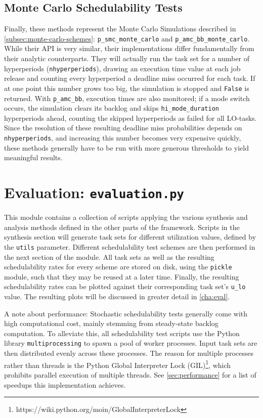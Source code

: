 \documentclass[a4paper,oneside]{csthesis}
\begin{document}
\subsection{Monte Carlo Schedulability Tests}
Finally, these methods represent the Monte Carlo Simulations described in \cref{subsec:monte-carlo-schemes}: \texttt{p\_smc\_monte\_carlo} and \texttt{p\_amc\_bb\_monte\_carlo}. While their API is very similar, their implementations differ fundamentally from their analytic counterparts. They will actually run the task set for a number of hyperperiods (\texttt{nhyperperiods}), drawing an execution time value at each job release and counting every hyperperiod a deadline miss occurred for each task. If at one point this number grows too big, the simulation is stopped and \texttt{False} is returned. With \texttt{p\_amc\_bb}, execution times are also monitored; if a mode switch occurs, the simulation clears its backlog and skips \texttt{hi\_mode\_duration} hyperperiods ahead, counting the skipped hyperperiods as failed for all LO-tasks. Since the resolution of these resulting deadline miss probabilities depends on \texttt{nhyperperiods}, and increasing this number becomes very expensive quickly, these methods generally have to be run with more generous thresholds to yield meaningful results.

\section{Evaluation: \texttt{evaluation.py}}
\label{sec:eval-mod}
This module contains a collection of scripts applying the various synthesis and analysis methods defined in the other parts of the framework. Scripts in the synthesis section will generate task sets for different utilization values, defined by the \texttt{utils} parameter. Different schedulability test schemes are then performed in the next section of the module. All task sets as well as the resulting schedulability rates for every scheme are stored on disk, using the \texttt{pickle} module, such that they may be reused at a later time. Finally, the resulting schedulability rates can be plotted against their corresponding task set's \texttt{u\_lo} value. The resulting plots will be discussed in greater detail in \cref{cha:eval}.

A note about performance: Stochastic schedulability tests generally come with high computational cost, mainly stemming from steady-state backlog computation. To alleviate this, all schedulability test scripts use the Python library \texttt{multiprocessing} to spawn a pool of worker processes. Input task sets are then distributed evenly across these processes. The reason for multiple processes rather than threads is the Python Global Interpreter Lock (GIL)\footnote{https://wiki.python.org/moin/GlobalInterpreterLock}, which prohibits parallel execution of multiple threads. See \cref{sec:performance} for a list of speedups this implementation achieves.
\end{document}
